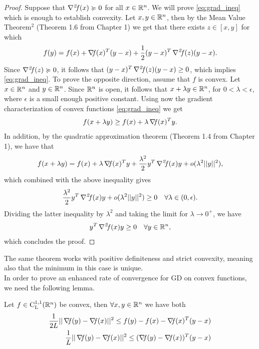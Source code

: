 \documentclass[10pt,a4paper]{article}
\begin{document}
\begin{proof}
	Suppose that $\operatorname*{\mathit{\nabla^2 \!f}}(x) \succcurlyeq 0$ for all $x \in \mathbb{R}^n$. We will prove \eqref{eq:grad_ineq} which is enough to establish convexity. Let $x,y\in \mathbb{R}^n$, then by the Mean Value Theorem$^2$ (Theorem 1.6 from Chapter 1) we get that there exists $z\in[x,y]$ for which 
	\begin{equation}\label{eq:mvt2_app}
		f(y) = f(x)+ \operatorname*{\mathit{\nabla \!f}} (x)^T(y-x) +\frac{1}{2}(y-x)^T\operatorname*{\mathit{\nabla^2 \!f}}(z)(y-x).
	\end{equation}
	Since $\operatorname*{\mathit{\nabla^2 \!f}}(z) \succcurlyeq 0$, it follows that $(y-x)^T\operatorname*{\mathit{\nabla^2 \!f}}(z)(y-x)\geq0$, which implies \eqref{eq:grad_ineq}.
	To prove the opposite direction, assume that $f$ is convex. Let $x\in \mathbb{R}^n$ and $y\in \mathbb{R}^n$. Since $\mathbb{R}^n$ is open, it follows that $x+\lambda y \in \mathbb{R}^n$, for $0<\lambda<\epsilon$, where $\epsilon$ is a small enough positive constant. Using now the gradient characterization of convex functions \eqref{eq:grad_ineq} we get 
	\begin{equation*}
		f(x+\lambda y) \geq f(x) + \lambda\operatorname*{\mathit{\nabla \!f}}(x)^Ty.
	\end{equation*}
	In addition, by the quadratic approximation theorem (Theorem 1.4 from Chapter 1), we have that 
	\begin{equation*}
		f(x+\lambda y) = f(x) + \lambda \operatorname*{\mathit{\nabla \!f}}(x)^Ty + \frac{\lambda^2}{2}y^T\operatorname*{\mathit{\nabla^2 \!f}}(x)y + o(\lambda^2||y||^2),
	\end{equation*}
	which combined with the above inequality gives 
	\begin{equation*}
		\frac{\lambda^2}{2}y^T\operatorname*{\mathit{\nabla^2 \!f}}(x)y + o(\lambda^2||y||^2) \geq 0 \quad \forall \lambda\in (0,\epsilon).
	\end{equation*}
	Dividing the latter inequality by $\lambda^2$ and taking the limit for $\lambda\to 0^+$, we have 
	\begin{equation*}
		y^T\operatorname*{\mathit{\nabla^2 \!f}}(x)y \geq 0 \quad \forall y \in \mathbb{R}^n,
	\end{equation*}
	which concludes the proof.
\end{proof}
The same theorem works with positive definiteness and strict convexity, meaning also that the minimum in this case is unique.\\
In order to prove an enhanced rate of convergence for GD on convex functions, we need the following lemma.
\begin{lemma}[Co-coercivity]
	Let $f\in \mathord{\mathrm{C^{1,1}_{L}}}(\mathbb{R}^n)$ be convex, then $\forall x, y \in \mathbb{R}^n$ we have both
	\begin{align}
		\frac{1}{2L} ||\operatorname*{\mathit{\nabla \!f}}(y)-\operatorname*{\mathit{\nabla \!f}}(x)||^2 \leq f(y)-f(x) -\operatorname*{\mathit{\nabla \!f}}(x)^T(y-x)\label{eq:pre_cocoercivity}\\
		\frac{1}{L} ||\operatorname*{\mathit{\nabla \!f}}(y)-\operatorname*{\mathit{\nabla \!f}}(x)||^2 \leq (\operatorname*{\mathit{\nabla \!f}}(y)-\operatorname*{\mathit{\nabla \!f}}(x))^T(y-x)\label{eq:cocoercivity}
	\end{align}
\end{lemma}
\end{document}
